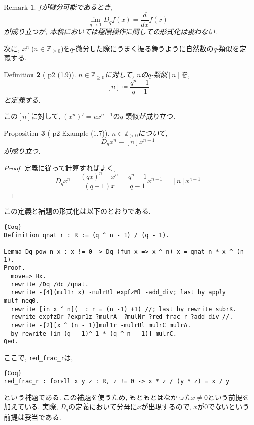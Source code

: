\documentclass[11pt]{jarticle}
\theoremstyle{mystyle}
\newtheorem{df}{$\textrm{Definition}$}[subsection]
\newtheorem{prop}[df]{$\textrm{Proposition}$}
\newtheorem{rmk}[df]{$\textrm{Remark}$}
\newcommand{\bdf}{\begin{shadebox} \begin{df}}
\newcommand{\edf}{\end{df} \end{shadebox}}
\newcommand{\bprop}{\begin{shadebox} \begin{prop}}
\newcommand{\eprop}{\end{prop} \end{shadebox}}
\newcommand{\brmk}{\begin{rmk}}
\newcommand{\ermk}{\end{rmk}}
\newcommand{\bpf}{\begin{proof}}
\newcommand{\epf}{\end{proof}}
\newcommand{\Z}{\mathbb{Z}}
\newcommand{\ra}{\rightarrow}
\newcommand{\0}{\textbf{0}}
\newcommand{\1}{\textbf{1}}
\newcommand{\2}{\textbf{2}}
\begin{document}
\brmk
  $f$が微分可能であるとき, 
  \[
    \lim_{q\ra1} D_qf(x) = \frac{d}{dx}f(x)
  \] 
  が成り立つが, 本稿においては極限操作に関しての形式化は扱わない. 
\ermk
次に, $x ^ n$ ($n \in \Z_{\ge 0}$)を$q$-微分した際にうまく振る舞うように自然数の$q$-類似を定義する. 
\bdf[\cite{Kac} p2 (1.9)]
  $n \in \Z_{\ge 0}$に対して, $n$の$q$-類似$[n]$を, 
  \[
    [n] \coloneqq \frac{q^n - 1}{q - 1}
  \]
  と定義する. 
\edf
この$[n]$に対して, $(x^n)' = n x^{n-1}$の$q$-類似が成り立つ.
\bprop[\cite{Kac} p2 Example (1.7)]
  $n \in \Z_{>0}$について, 
  \[
    D_q x^n = [n] x ^{n - 1}
  \]
  が成り立つ. 
\eprop
\bpf
  定義に従って計算すればよく, 
  \[
    D_q x ^ n = \frac{(qx) ^ n - x ^ n}{(q - 1) x}
                 = \frac{q^n - 1}{q - 1} x ^ {n - 1}
                 = [n] x ^ {n - 1}
  \] 
\epf
この定義と補題の形式化は以下のとおりである. 
\begin{lstlisting}{Coq}
Definition qnat n : R := (q ^ n - 1) / (q - 1).

Lemma Dq_pow n x : x != 0 -> Dq (fun x => x ^ n) x = qnat n * x ^ (n - 1).
Proof.
  move=> Hx.
  rewrite /Dq /dq /qnat.
  rewrite -{4}(mul1r x) -mulrBl expfzMl -add_div; last by apply mulf_neq0.
  rewrite [in x ^ n](_ : n = (n -1) +1) //; last by rewrite subrK.
  rewrite expfzDr ?expr1z ?mulrA -?mulNr ?red_frac_r ?add_div //.
  rewrite -{2}[x ^ (n - 1)]mul1r -mulrBl mulrC mulrA.
  by rewrite [in (q - 1)^-1 * (q ^ n - 1)] mulrC.
Qed.
\end{lstlisting}
ここで, {\tt red\_frac\_r}は, 
\begin{lstlisting}{Coq}
red_frac_r : forall x y z : R, z != 0 -> x * z / (y * z) = x / y \end{lstlisting}
という補題である. この補題を使うため, もともとはなかった{\tt $x \ne 0$}という前提を加えている. 実際, $D_q$の定義において分母に$x$が出現するので, $x$が$0$でないという前提は妥当である. 
\end{document}
